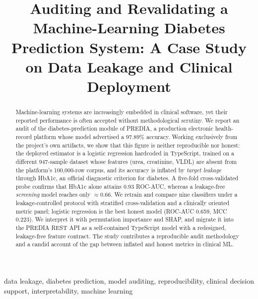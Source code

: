 \documentclass[conference]{IEEEtran}
\begin{document}
\title{Auditing and Revalidating a Machine-Learning Diabetes
Prediction System: A Case Study on Data Leakage and Clinical Deployment}

\author{%
}

\maketitle

\begin{abstract}
Machine-learning systems are increasingly embedded in clinical software, yet
their reported performance is often accepted without methodological scrutiny.
We report an audit of the diabetes-prediction module of PREDIA, a production
electronic health-record platform whose model advertised a 97.89\% accuracy.
Working exclusively from the project's own artifacts, we show that this figure
is neither reproducible nor honest: the deployed estimator is a logistic
regression hardcoded in TypeScript, trained on a different 947-sample dataset
whose features (urea, creatinine, VLDL) are absent from the platform's
100{,}000-row corpus, and its accuracy is inflated by \emph{target leakage}
through HbA1c, an official diagnostic criterion for diabetes. A five-fold
cross-validated probe confirms that HbA1c alone attains 0.93 ROC-AUC, whereas a
leakage-free \emph{screening} model reaches only $\approx$0.66. We retrain and
compare nine classifiers under a leakage-controlled protocol with stratified
cross-validation and a clinically oriented metric panel; logistic regression is
the best honest model (ROC-AUC 0.659, MCC 0.223). We interpret it with
permutation importance and SHAP, and migrate it into the PREDIA REST API as a
self-contained TypeScript model with a redesigned, leakage-free feature
contract. The study contributes a reproducible audit methodology and a candid
account of the gap between inflated and honest metrics in clinical ML.
\end{abstract}

\begin{IEEEkeywords}
data leakage, diabetes prediction, model auditing, reproducibility,
clinical decision support, interpretability, machine learning
\end{IEEEkeywords}
\end{document}
